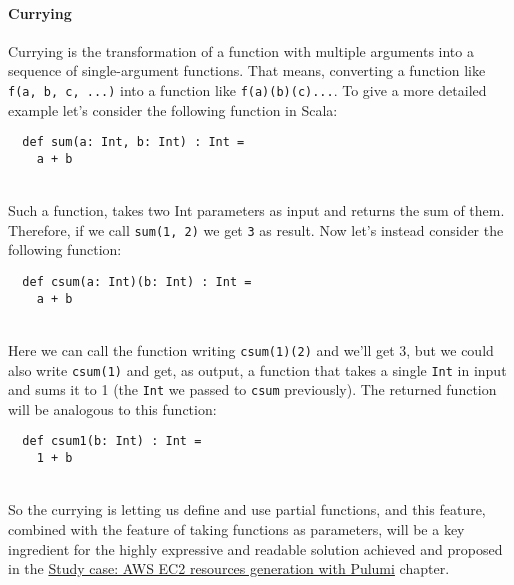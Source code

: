 \paragraph{Currying}
Currying is the transformation of a function with multiple arguments into a sequence of single-argument functions. That means, converting a function like \texttt{f(a, b, c, ...)} into a function like \texttt{f(a)(b)(c)...}.
To give a more detailed example let's consider the following function in Scala:
\begin{verbatim}
  def sum(a: Int, b: Int) : Int = 
    a + b
\end{verbatim}\mbox{}\\
Such a function, takes two Int parameters as input and returns the sum of them.
Therefore, if we call \texttt{sum(1, 2)} we get \texttt{3} as result.
Now let's instead consider the following function:
\begin{verbatim}
  def csum(a: Int)(b: Int) : Int = 
    a + b
\end{verbatim}\mbox{}\\
Here we can call the function writing \texttt{csum(1)(2)} and we'll get 3, but we could also write \texttt{csum(1)} and get, as output, a function that takes a single \texttt{Int} in input and sums it to 1 (the \texttt{Int} we passed to \texttt{csum} previously).
The returned function will be analogous to this function:
\begin{verbatim}
  def csum1(b: Int) : Int = 
    1 + b
\end{verbatim}\mbox{}\\
So the currying is letting us define and use partial functions, and this feature, combined with the feature of taking functions as parameters, will be a key ingredient for the highly expressive and readable solution achieved and proposed in the \hyperref[cap:case-study]{Study case: AWS EC2 resources generation with Pulumi} chapter.

